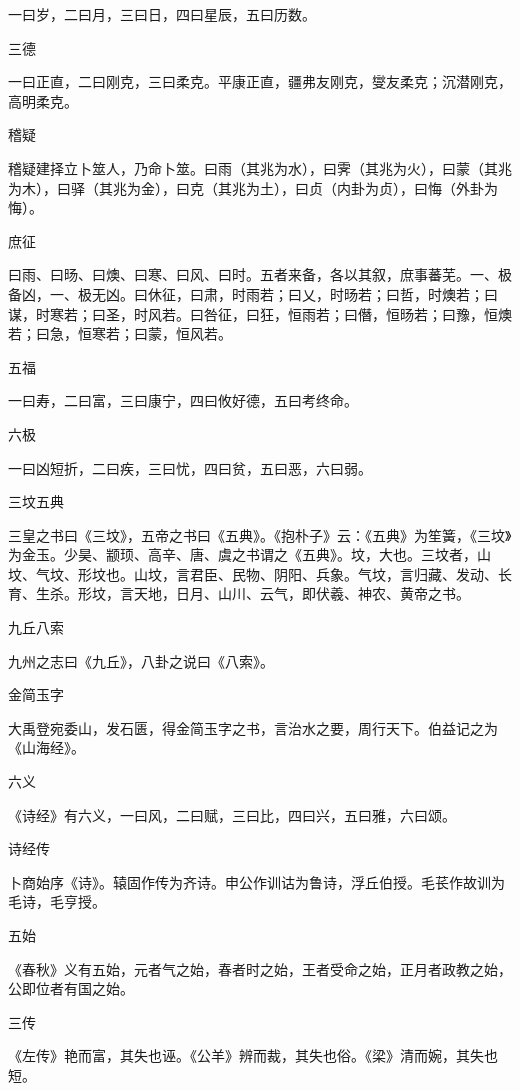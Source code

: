 \documentclass[a4paper,12pt,UTF8,twoside]{ctexbook}
\begin{document}
    一曰岁，二曰月，三曰日，四曰星辰，五曰历数。
    
    三德
    
    一曰正直，二曰刚克，三曰柔克。平康正直，疆弗友刚克，燮友柔克；沉潜刚克，高明柔克。
    
    稽疑
    
    稽疑建择立卜筮人，乃命卜筮。曰雨（其兆为水），曰霁（其兆为火），曰蒙（其兆为木），曰驿（其兆为金），曰克（其兆为土），曰贞（内卦为贞），曰悔（外卦为悔）。
    
    庶征
    
    曰雨、曰旸、曰燠、曰寒、曰风、曰时。五者来备，各以其叙，庶事蕃芜。一、极备凶，一、极无凶。曰休征，曰肃，时雨若；曰乂，时旸若；曰哲，时燠若；曰谋，时寒若；曰圣，时风若。曰咎征，曰狂，恒雨若；曰僭，恒旸若；曰豫，恒燠若；曰急，恒寒若；曰蒙，恒风若。
    
    五福
    
    一曰寿，二曰富，三曰康宁，四曰攸好德，五曰考终命。
    
    六极
    
    一曰凶短折，二曰疾，三曰忧，四曰贫，五曰恶，六曰弱。
    
    三坟五典
    
    三皇之书曰《三坟》，五帝之书曰《五典》。《抱朴子》云：《五典》为笙簧，《三坟》为金玉。少昊、颛顼、高辛、唐、虞之书谓之《五典》。坟，大也。三坟者，山坟、气坟、形坟也。山坟，言君臣、民物、阴阳、兵象。气坟，言归藏、发动、长育、生杀。形坟，言天地，日月、山川、云气，即伏羲、神农、黄帝之书。
    
    九丘八索
    
    九州之志曰《九丘》，八卦之说曰《八索》。
    
    金简玉字
    
    大禹登宛委山，发石匮，得金简玉字之书，言治水之要，周行天下。伯益记之为《山海经》。
    
    六义
    
    《诗经》有六义，一曰风，二曰赋，三曰比，四曰兴，五曰雅，六曰颂。
    
    诗经传
    
    卜商始序《诗》。辕固作传为齐诗。申公作训诂为鲁诗，浮丘伯授。毛苌作故训为毛诗，毛亨授。
    
    五始
    
    《春秋》义有五始，元者气之始，春者时之始，王者受命之始，正月者政教之始，公即位者有国之始。
    
    三传
    
    《左传》艳而富，其失也诬。《公羊》辨而裁，其失也俗。《梁》清而婉，其失也短。
    
\end{document}
